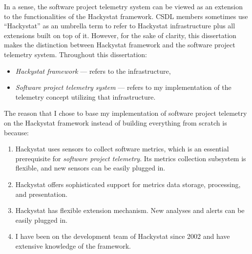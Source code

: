 In a sense, the software project telemetry system can be viewed as an extension to the functionalities of the Hackystat framework. CSDL members sometimes use ``Hackystat'' as an umbrella term to refer to Hackystat infrastructure plus all extensions built on top of it. However, for the sake of clarity, this dissertation makes the distinction between Hackystat framework and the software project telemetry system. Throughout this dissertation:
\begin{itemize}
	\item \textit{Hackystat framework} --- refers to the infrastructure,
	\item \textit{Software project telemetry system} --- refers to my implementation of the telemetry concept utilizing that infrastructure.
\end{itemize}


The reason that I chose to base my implementation of software project telemetry on the Hackystat framework instead of building everything from scratch is because:

\begin{enumerate}
	\item Hackystat uses sensors to collect software metrics, which is an essential prerequisite for \textit{software project telemetry}. Its metrics collection subsystem is flexible, and new sensors can be easily plugged in.
	\item Hackystat offers sophisticated support for metrics data storage, processing, and presentation.
	\item Hackystat has flexible extension mechanism. New analyses and alerts can be easily plugged in.
	\item I have been on the development team of Hackystat since 2002 and have extensive knowledge of the framework.
\end{enumerate}








